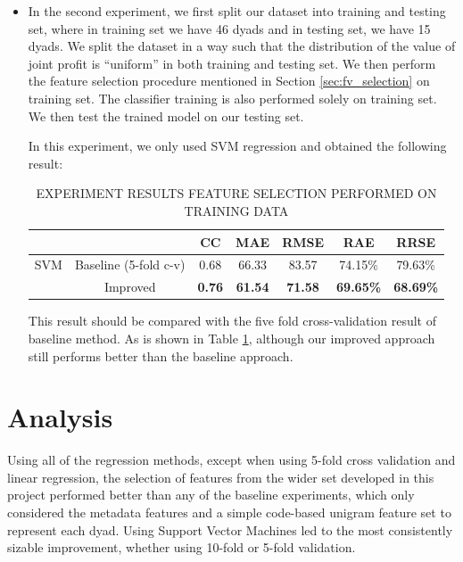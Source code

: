 \documentclass[11pt]{article} %
\begin{document}
\begin{itemize}[1)]
\item In the second experiment, we first split our dataset into training and testing set, where in training set we have 46 dyads and in testing set, we have 15 dyads. We split the dataset in a way such that the distribution of the value of joint profit is ``uniform'' in both training and testing set.
We then perform the feature selection procedure mentioned in Section \ref{sec:fv_selection} on training set. The classifier training is also performed solely on training set. We then test the trained model on our testing set.

In this experiment, we only used SVM regression and obtained the following result:

\begin{table}
  \centering
  \caption{EXPERIMENT RESULTS FEATURE SELECTION PERFORMED ON TRAINING DATA}
  \begin{tabular}{|c|c|c|c|c|c|c|}
     \hline
         &       & CC & MAE & RMSE & RAE & RRSE\\
     \hline
     SVM & Baseline (5-fold c-v)& 0.68  & 66.33  & 83.57  & 74.15\%  & 79.63\%\\
         & Improved & \textbf{0.76}  & \textbf{61.54 } & \textbf{71.58}  & \textbf{69.65\% } & \textbf{68.69\%}\\
  \hline
  \end{tabular}\label{tab:result3}
\end{table}

This result should be compared with the five fold cross-validation result of baseline method. As is shown in Table \ref{tab:result3}, although our improved approach still performs better than the baseline approach.

\end{itemize}

\section{Analysis}

Using all of the regression methods, except when using 5-fold cross validation and linear regression, the selection of features from the wider set developed in this project performed better than any of the baseline experiments, which only considered the metadata features and a simple code-based unigram feature set to represent each dyad.  Using Support Vector Machines led to the most consistently sizable improvement, whether using 10-fold or 5-fold validation.
\end{document}
